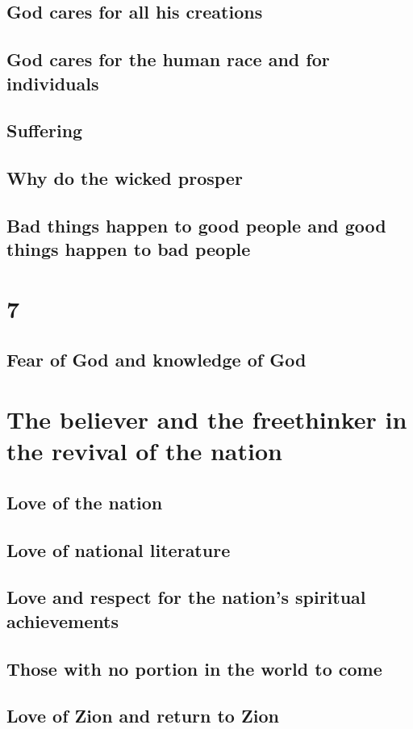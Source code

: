 \documentclass[11pt, a5paper, twoside, chapterprefix, openany]{scrbook}
\begin{document}
\chapter{God cares for all his creations}
\chapter{God cares for the human race and for individuals}
\chapter{Suffering}
\chapter{Why do the wicked prosper}
\chapter{Bad things happen to good people and good things happen to bad people}
\part{7}
\chapter{Fear of God and knowledge of God}
\part{The believer and the freethinker in the revival of the nation}
\chapter{Love of the nation}
\chapter{Love of national literature}
\chapter{Love and respect for the nation’s spiritual achievements}
\chapter{Those with no portion in the world to come}
\chapter{Love of Zion and return to Zion}
\end{document}
